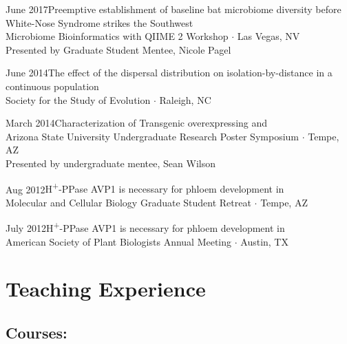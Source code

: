 \documentclass[]{cv-style}          %
\begin{document}
\begin{entrylist}
{June 2017}{Preemptive establishment of baseline bat microbiome diversity before White-Nose Syndrome strikes the Southwest}{\\Microbiome Bioinformatics with QIIME 2 Workshop $\cdot$ Las Vegas, NV\\Presented by Graduate Student Mentee, Nicole Pagel}
{\vspace{-0.3cm}}

{June 2014}{The effect of the dispersal distribution on isolation-by-distance in a continuous population}{\\Society for the Study of Evolution $\cdotp$ Raleigh, NC}
{\vspace{-0.3cm}}

{March 2014}{Characterization of Transgenic  overexpressing  and }{\\Arizona State University Undergraduate Research Poster Symposium $\cdotp$ Tempe, AZ\\
Presented by undergraduate mentee, Sean Wilson}
{\vspace{-0.3cm}}
   
{Aug 2012}{H\textsuperscript{+}-PPase AVP1 is necessary for phloem development in }{\\Molecular and Cellular Biology Graduate Student Retreat $\cdotp$ Tempe, AZ}
{\vspace{-0.3cm}}

{July 2012}{H\textsuperscript{+}-PPase AVP1 is necessary for phloem development in }{\\American Society of Plant Biologists Annual Meeting $\cdotp$ Austin, TX}
{\vspace{-0.3cm}}
\end{entrylist}



\section{Teaching Experience}
\subsection{\textbf{Courses:}}
\end{document}
